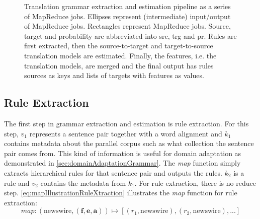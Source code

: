 \begin{figure}
\caption{Translation grammar extraction and estimation pipeline as a series of MapReduce jobs. Ellipses
represent (intermediate) input/output of MapReduce jobs. Rectangles represent
MapReduce jobs. Source, target and probability are abbreviated into
src, trg and pr. Rules are first extracted, then the source-to-target and
target-to-source translation models are estimated. Finally, the features,
i.e. the translation models, are merged and the final output has rules sources
as keys and lists of targets with features as values.}
\label{fig:ruleXtractionPipeline}
\end{figure}

\subsection{Rule Extraction}

The first step in grammar extraction and estimation is rule extraction. For
this step, $v_1$ represents a sentence pair together with a word alignment and $k_1$
contains metadata about the parallel corpus such as what collection the sentence
pair comes from. This kind of information is useful for domain adaptation as
demonstrated in \autoref{sec:domainAdaptationGrammar}. The \emph{map}
function simply extracts hierarchical rules for
that sentence pair and outputs the rules. $k_2$ is a rule and $v_2$ contains
the metadata from $k_1$. For rule extraction, there is no reduce step.
\autoref{eq:mapIllustrationRuleXtraction} illustrates the \emph{map} function
for rule extraction:
%
\begin{equation}
  map : (\text{newswire}, (\bm{f}, \bm{e}, \bm{a})) \longmapsto [(r_1, \text{newswire}), (r_2, \text{newswire}),...]
  \label{eq:mapIllustrationRuleXtraction}
\end{equation}

